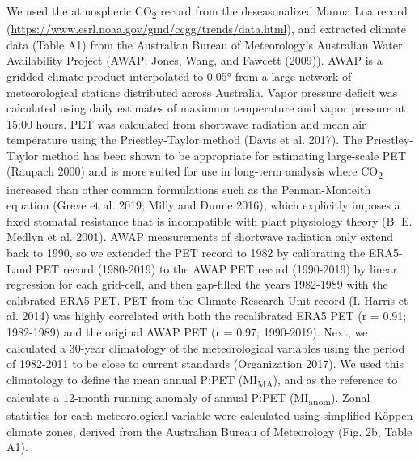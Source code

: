 \documentclass[
]{article}
\begin{document}
We used the atmospheric CO\textsubscript{2} record from the
deseasonalized Mauna Loa record
(\url{https://www.esrl.noaa.gov/gmd/ccgg/trends/data.html}), and
extracted climate data (Table A1) from the Australian Bureau of
Meteorology's Australian Water Availability Project (AWAP; Jones, Wang,
and Fawcett (2009)). AWAP is a gridded climate product interpolated to
0.05° from a large network of meteorological stations distributed across
Australia. Vapor pressure deficit was calculated using daily estimates
of maximum temperature and vapor pressure at 15:00 hours. PET was
calculated from shortwave radiation and mean air temperature using the
Priestley-Taylor method (Davis et al. 2017). The Priestley-Taylor method
has been shown to be appropriate for estimating large-scale PET (Raupach
2000) and is more suited for use in long-term analysis where
CO\textsubscript{2} increased than other common formulations such as the
Penman-Monteith equation (Greve et al. 2019; Milly and Dunne 2016),
which explicitly imposes a fixed stomatal resistance that is
incompatible with plant physiology theory (B. E. Medlyn et al. 2001).
AWAP measurements of shortwave radiation only extend back to 1990, so we
extended the PET record to 1982 by calibrating the ERA5-Land PET record
(1980-2019) to the AWAP PET record (1990-2019) by linear regression for
each grid-cell, and then gap-filled the years 1982-1989 with the
calibrated ERA5 PET. PET from the Climate Research Unit record (I.
Harris et al. 2014) was highly correlated with both the recalibrated
ERA5 PET (r = 0.91; 1982-1989) and the original AWAP PET (r = 0.97;
1990-2019). Next, we calculated a 30-year climatology of the
meteorological variables using the period of 1982-2011 to be close to
current standards (Organization 2017). We used this climatology to
define the mean annual P:PET (MI\textsubscript{MA}), and as the
reference to calculate a 12-month running anomaly of annual P:PET
(MI\textsubscript{anom}). Zonal statistics for each meteorological
variable were calculated using simplified Köppen climate zones, derived
from the Australian Bureau of Meteorology (Fig. 2b, Table A1).
\end{document}
